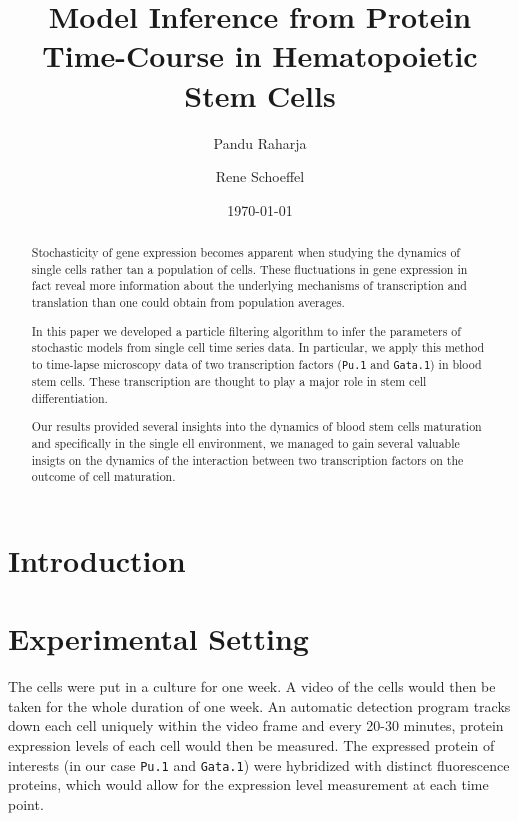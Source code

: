 \documentclass[12pt, oneside]{article}
\begin{document}
\title{Model Inference from Protein Time-Course in Hematopoietic Stem Cells}

\date{\today}

\author{Pandu Raharja \and Rene Schoeffel}

\maketitle

\begin{abstract}
Stochasticity of gene expression becomes apparent when studying the dynamics of single cells rather tan a population of cells. These fluctuations in gene expression in fact reveal more information about the underlying mechanisms of transcription and translation than one could obtain from population averages.

In this paper we developed a particle filtering algorithm to infer the parameters of stochastic models from single cell time series data. In particular, we apply this method to time-lapse microscopy data of two transcription factors (\texttt{Pu.1} and \texttt{Gata.1}) in blood stem cells. These transcription are thought to play a major role in stem cell differentiation.

Our results provided several insights into the dynamics of blood stem cells maturation and specifically in the single ell environment, we managed to gain several valuable insigts on the dynamics of the interaction between two transcription factors on the outcome of cell maturation.
\end{abstract}

\section{Introduction}

\section{Experimental Setting}

The cells were put in a culture for one week. A video of the cells would then be taken for the whole duration of one week. An automatic detection program tracks down each cell uniquely within the video frame and every 20-30 minutes, protein expression levels of each cell would then be measured. The expressed protein of interests (in our case \texttt{Pu.1} and \texttt{Gata.1}) were hybridized with distinct fluorescence proteins, which would allow for the expression level measurement at each time point.
\end{document}
